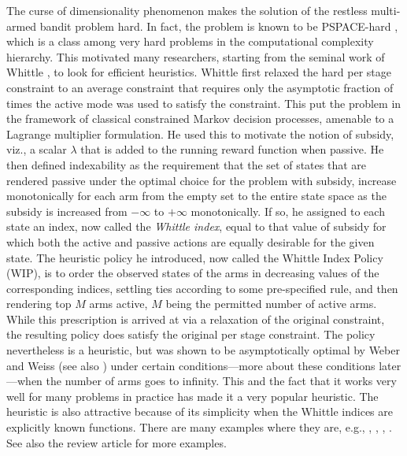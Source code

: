 \documentclass[12pt]{article}
\numberwithin{equation}{section}
\newcommand{\1}{\textbf{1}}
\begin{document}
The curse of dimensionality phenomenon makes the solution of the restless multi-armed bandit problem hard.
In fact, the problem is known to be PSPACE-hard \cite{Papadimitriou}, which is a class among very hard problems in the computational complexity hierarchy.
This motivated many researchers, starting from the seminal work of Whittle \cite{Whittle}, to look for efficient heuristics.
Whittle first relaxed the hard per stage constraint to an average constraint that requires only the asymptotic fraction of times the active mode was used to satisfy the constraint. This put the problem in the framework of classical constrained Markov decision processes, amenable to a Lagrange multiplier formulation. He used this to motivate the notion of subsidy, viz., a scalar $\lambda$ that is added to the running reward function when passive. He then defined indexability as the requirement that the set of states that are rendered passive under the optimal choice for the problem with subsidy, increase monotonically for each arm from the empty set to the entire state space as the subsidy is increased from $-\infty$ to $+\infty$ monotonically. If so, he assigned to each state an index, now called the {\it Whittle index}, equal to that value of subsidy for which both the active and passive actions are equally desirable for the given state. The heuristic policy he introduced, now called the Whittle Index Policy (WIP), is to order the observed states of the arms in decreasing values of the corresponding indices, settling ties according to some pre-specified rule, and then rendering top $M$ arms active, $M$ being the permitted number of active arms. While this prescription is arrived at via a relaxation of the original constraint, the resulting policy does satisfy the original per stage constraint. The policy nevertheless is a heuristic, but was shown to be asymptotically optimal by Weber and Weiss \cite{Weber} (see also \cite{Verloop})
under certain conditions---more about these conditions later---when the number of arms goes to infinity. 
This and the fact that it works very well for many problems in practice has made it a very popular heuristic.
The heuristic is also attractive because of its simplicity when the Whittle indices are explicitly known functions. There are many examples where they are, e.g., \cite{Avrachenkov}, \cite{Raghunathan}, \cite{Tripathy}, \cite{Yu}.  See also the review article \cite{Nino-Mora} for more examples.
\end{document}
